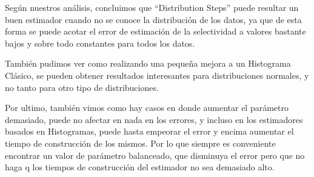 	Seg\'un nuestros an\'alisis, concluimos que ``Distribution Steps'' puede resultar un buen estimador cuando no se conoce la distribuci\'on de los datos, ya que de esta forma se puede acotar el error de estimaci\'on de la selectividad a valores bastante bajos y sobre todo constantes para todos los datos.
		
	Tambi\'en pudimos ver como realizando una peque\~na mejora a un Histograma Cl\'asico, se pueden obtener resultados interesantes para distribuciones normales, y no tanto para otro tipo de distribuciones.
	
	Por ultimo, tambi\'en vimos como hay casos en donde aumentar el par\'ametro demasiado, puede no afectar en nada en los errores, y incluso en los estimadores basados en Histogramas, puede hasta empeorar el error y encima aumentar el tiempo de construcci\'on de los mismos. Por lo que siempre es conveniente encontrar un valor de par\'ametro balanceado, que disminuya el error pero que no haga q los tiempos de construcci\'on del estimador no sea demasiado alto.